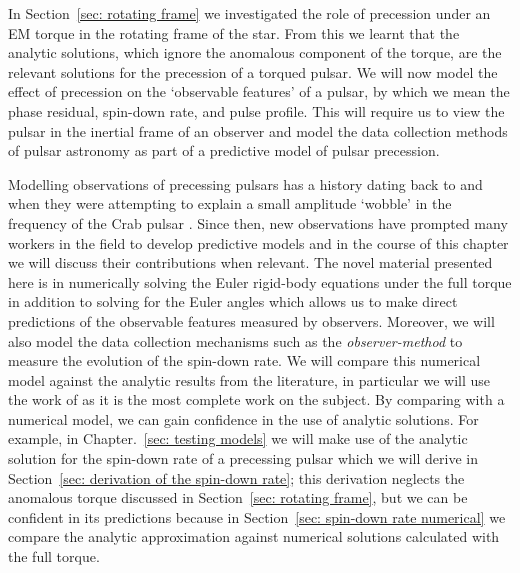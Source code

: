 \documentclass[../full_thesis/full_thesis.tex]{subfiles}
\begin{document}
In Section~\ref{sec: rotating frame} we investigated the role of precession
under an EM torque in the rotating frame of the star. From this we learnt that
the \citet{Goldreich1970} analytic solutions, which ignore the anomalous
component of the \citet{Deutsch1955} torque, are the relevant solutions for the
precession of a torqued pulsar. We will now model the effect of precession on
the `observable features' of a pulsar, by which we mean the phase residual,
spin-down rate, and pulse profile.  This will require us to view the pulsar in
the inertial frame of an observer and model the data collection methods of
pulsar astronomy as part of a predictive model of pulsar precession.

Modelling observations of precessing pulsars has a history dating back to
\citet{Ruderman1970} and \citet{chiuderi1970shape} when they were attempting to
explain a small amplitude `wobble' in the frequency of the Crab pulsar
\citep{Richards1969, Richards1969b}. Since then, new observations have prompted
many workers in the field to develop predictive models and in the course of
this chapter we will discuss their contributions when relevant.  The novel
material presented here is in numerically solving the Euler rigid-body
equations under the full \citet{Deutsch1955} torque in addition to solving for
the Euler angles which allows us to make direct predictions of the observable
features measured by observers. Moreover, we will also model the data
collection mechanisms such as the \emph{observer-method} to measure the evolution of
the spin-down rate. We will compare this numerical model against the analytic
results from the literature, in particular we will use the work of
\citet{Jones2001} as it is the most complete work on the subject. By comparing
with a numerical model, we can gain confidence in the use of analytic
solutions. For example, in Chapter.~\ref{sec: testing models} we will make use
of the analytic solution for the spin-down rate of a precessing pulsar which we
will derive in Section~\ref{sec: derivation of the spin-down rate}; this
derivation neglects the anomalous torque discussed in Section~\ref{sec:
rotating frame}, but we can be confident in its predictions because in
Section~\ref{sec: spin-down rate numerical} we compare the analytic
approximation against numerical solutions calculated with the full torque.
\end{document}
